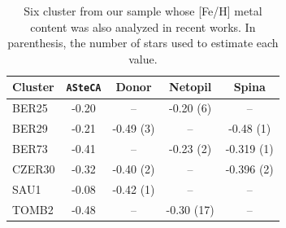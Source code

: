 \documentclass[referee]{aa}
\begin{document}
  \begin{table}
  \caption{Six cluster from our sample whose [Fe/H] metal content was also
  analyzed in recent works. In parenthesis, the number of stars used to estimate
  each value.}
  \label{tab:metal}
  \centering
  \begin{tabular}{lcccc}
  \hline\hline
  Cluster & \texttt{ASteCA} & Donor & Netopil & Spina \\
  \hline %
   BER25  & -0.20  & --         & -0.20 (6)  & -- \\
   BER29  & -0.21  & -0.49 (3)  & --         & -0.48 (1)  \\
   BER73  & -0.41  & --         & -0.23 (2)  & -0.319 (1)  \\
   CZER30 & -0.32  & -0.40 (2)  & --         & -0.396 (2)  \\
   SAU1   & -0.08  & -0.42 (1)  & --         & --  \\
   TOMB2  & -0.48  & --         & -0.30 (17) & -- \\
  \hline
  \end{tabular}
  \end{table}
\end{document}
